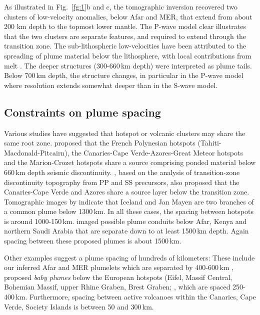 \documentclass[a4paper,10pt,twocolumn]{paper}
\begin{document}
As illustrated in Fig.~\ref{fg:1}b and c, the tomographic inversion recovered two clusters of low-velocity anomalies, below Afar and MER, that extend from about 200 km depth to the topmost lower mantle. The P-wave model clear illustrates that the two clusters are separate features, and required to extend through the transition zone. The sub-lithospheric low-velocities have been attributed to the spreading of plume material below the lithosphere, with local contributions from melt \citep{civiero-etal-2015,civiero-etal-2016}. The deeper structures (300-660\,km depth) were interpreted as plume tails. Below 700\,km depth, the structure changes, in particular in the P-wave model where resolution extends somewhat deeper than in the S-wave model.

\subsection{Constraints on plume spacing}

Various studies have suggested that hotspot or volcanic clusters may share the same root zone. \cite{kumagai-etal-2007} proposed that the French Polynesian hotspots (Tahiti-Macdonald-Pitcairn), the Canaries-Cape Verde-Azores-Great Meteor hotspots and the Marion-Crozet hotspots share a source comprising ponded material below 660\,km depth seismic discontinuity. \cite{saki-etal-2015}, based on the analysis of transition-zone discontinuity topography from PP and SS precursors, also proposed that the Canaries-Cape Verde and Azores share a source layer below the transition zone. Tomographic images by \cite{rickers-etal-2013} indicate that Iceland and Jan Mayen are two branches of a common plume below 1300\,km. In all these cases, the spacing between hotspots is around 1000-150\,km. \cite{chang-2011} imaged possible plume conduits below Afar, Kenya and northern Saudi Arabia that are separate down to at least 1500\,km depth. Again spacing between these proposed plumes is about 1500\,km.

Other examples suggest a plume spacing of hundreds of kilometers: These include our inferred Afar and MER plumelets which are separated by 400-600\,km \citep{civiero-etal-2015,civiero-etal-2016}, proposed \emph{baby plumes} below the European hotspots (Eifel, Massif Central, Bohemian Massif, upper Rhine Graben, Brest Graben; \citealp{goes-etal-1999,granet-etal-1995}, which are spaced 250-400\,km. Furthermore, spacing between active volcanoes within the Canaries, Cape Verde, Society Islands is between 50 and 300\,km.
\end{document}
